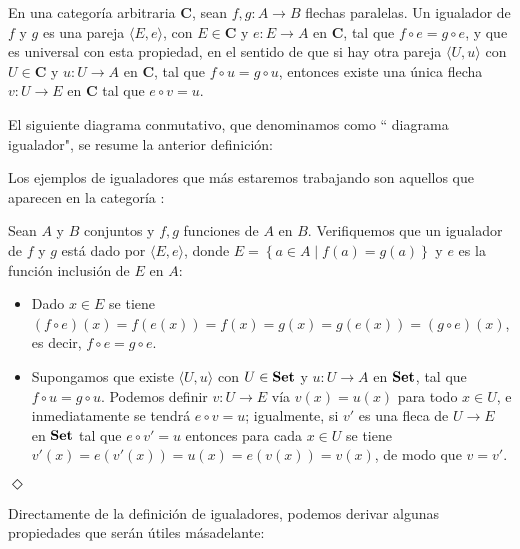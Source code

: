 \begin{Def}
   En una categoría arbitraria $\textbf{C}$, sean $f,g:A\to B$ flechas paralelas. Un igualador de $f$ y $g$ es una pareja $\langle E,e\rangle$, con $E\in\textbf{C}$ y $e:E\to A$ en $\textbf{C}$, tal que $f\circ e=g\circ e$, y que es universal con esta propiedad, en el sentido de que si hay otra pareja $\langle U,u\rangle$ con $U\in \textbf{C}$ y $u:U\to A$ en $\textbf{C}$, tal que $f\circ u=g\circ u$, entonces existe una única flecha $v:U\to E$ en $\textbf{C}$ tal que $e\circ v=u$. 
\end{Def}
El siguiente diagrama conmutativo, que denominamos como `` diagrama igualador", se resume la anterior definición:


Los ejemplos de igualadores que más estaremos trabajando son aquellos que aparecen en la categoría :
\begin{Ejm}
   Sean $A$ y $B$ conjuntos y $f,g$ funciones de $A$ en $B$. Verifiquemos que un igualador de $f$ y $g$ está dado por $\langle E,e\rangle$, donde $E=\left\lbrace a\in A\mid f(a)=g(a)\right\rbrace$ y $e$ es la función inclusión de $E$ en $A$:
   \begin{itemize}
      \item Dado $x\in E$ se tiene $(f\circ e)(x)=f(e(x))=f(x)=g(x)=g(e(x))=(g\circ e)(x)$, es decir, $f\circ e=g\circ e$.
      \item Supongamos que existe $\langle U,u\rangle$ con $U\in \normalfont{\textbf{Set}}$ y $u:U\to A$ en $\normalfont{\textbf{Set}}$, tal que $f\circ u=g\circ u$. Podemos definir $v:U\to E$ vía $v(x)=u(x)$ para todo $x\in U$, e inmediatamente se tendrá $e\circ v=u$; igualmente, si $v'$ es una fleca de $U\to E$ en $\normalfont{\textbf{Set}}$ tal que $e\circ v'=u$ entonces para cada $x\in U$ se tiene $v'(x)=e(v'(x))=u(x)=e(v(x))=v(x)$, de modo que $v=v'$.
   \end{itemize}
\hspace{\fill}$\Diamond$
\end{Ejm}
Directamente de la definición de igualadores, podemos derivar algunas propiedades que serán útiles másadelante:
\begin{Prop}
  
\end{Prop}
